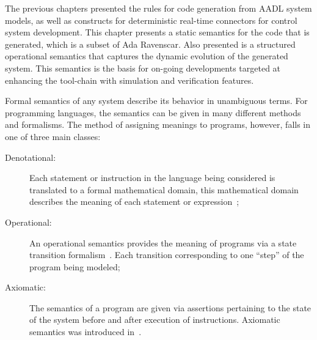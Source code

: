 \newcommand{\rset}{\frac{}{\text{\ttfamily\ Set\ }}}

\newcommand{\rgvt}{\MM{ \frac{}{\text{\ttfamily\  Await\_Event\ }} }}

\newcommand{\rsvt}{\frac{}{\text{\ttfamily\ Send\_Event\ }}}



\newcommand{\mgvt}{\frac{}{\text{\ttfamily\ \ Await\_Event\ }}}

\newcommand{\msvt}{\frac{}{{\text{\ttfamily\ \tiny Send\_Event\ }}}}

\newcommand{\rx}{\frac{}{\large \ x \ }}

\newcommand{\smcirc}{{\scriptscriptstyle \circ}}

\newcommand{\smodot}{{\scriptscriptstyle \odot}}

\newcommand{\smoplus}{\,{\scriptstyle \oplus}\,}

\newcommand{\SFT}[1]{\text{\sffamily #1}}

\newcommand{\FNT}[1]{\text{\footnotesize #1}}

\newcommand{\SC}[1]{$\text{\scshape{#1}}$}

The previous chapters presented the rules for code generation from
AADL system models, as well as constructs for deterministic real-time
connectors for control system development. This chapter presents a
static semantics for the code that is generated, which is a subset of
Ada Ravenscar. Also presented is a structured operational semantics
that captures the dynamic evolution of the generated system. This
semantics is the basis for on-going developments targeted at enhancing
the tool-chain with simulation and verification features.

Formal semantics of any system describe its behavior in unambiguous
terms. For programming languages, the semantics can be given in many
different methods and formalisms. The method of assigning meanings to
programs, however, falls in one of three main classes:\\

\begin{description}
\item[Denotational:]{Each statement or instruction in the language
  being considered is translated to a formal mathematical domain, this
  mathematical domain describes the meaning of each statement or
  expression~\cite{tennent@cacm76};}
\item[Operational:]{An operational semantics provides the meaning of
  programs via a state transition formalism~\cite{plotkin-sos}. Each
  transition corresponding to one ``step'' of the program being
  modeled;}
\item[Axiomatic:]{The semantics of a program are given via assertions
  pertaining to the state of the system before and after execution of
  instructions. Axiomatic semantics was introduced
  in~\cite{floyd@macs67, hoare@cacm69}.}
\end{description}

